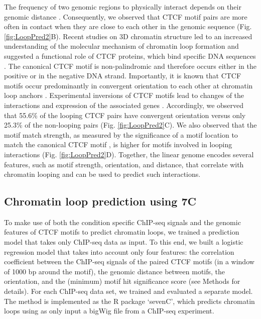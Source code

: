\documentclass[a4paper,twoside=true,openright,parskip=full,chapterprefix=true,11pt,headings=normal,bibliography=totoc,listof=totoc,titlepage=on,captions=tableabove,draft=false]{scrreprt}
\theoremstyle{definition}
\theoremstyle{definition}
\theoremstyle{definition}
\theoremstyle{remark}
\begin{document}
The frequency of two genomic regions to physically interact depends on
their genomic distance \citep{Lieberman-Aiden2009}. Consequently, we
observed that CTCF motif pairs are more often in contact when they are
close to each other in the genomic sequence (Fig. \ref{fig:LoopPred2}B).
Recent studies on 3D chromatin structure led to an increased
understanding of the molecular mechanism of chromatin loop formation and
suggested a functional role of CTCF proteins, which bind specific DNA
sequences \citep{Merkenschlager2016}. The canonical CTCF motif is
non-palindromic and therefore occurs either in the positive or in the
negative DNA strand. Importantly, it is known that CTCF motifs occur
predominantly in convergent orientation to each other at chromatin loop
anchors \citep{Rao2014, VietriRudan2015}. Experimental inversions of
CTCF motifs lead to changes of the interactions and expression of the
associated genes \citep{Guo2015, deWit2015}. Accordingly, we observed
that 55.6\% of the looping CTCF pairs have convergent orientation versus
only 25.3\% of the non-looping pairs (Fig. \ref{fig:LoopPred2}C). We
also observed that the motif match strength, as measured by the
significance of a motif location to match the canonical CTCF motif
\citep{Khan2018}, is higher for motifs involved in looping interactions
(Fig. \ref{fig:LoopPred2}D). Together, the linear genome encodes several
features, such as motif strength, orientation, and distance, that
correlate with chromatin looping and can be used to predict such
interactions.

\hypertarget{chromatin-loop-prediction-using-7c}{%
\subsection{Chromatin loop prediction using
7C}\label{chromatin-loop-prediction-using-7c}}

To make use of both the condition specific ChIP-seq signals and the
genomic features of CTCF motifs to predict chromatin loops, we trained a
prediction model that takes only ChIP-seq data as input. To this end, we
built a logistic regression model that takes into account only four
features: the correlation coefficient between the ChIP-seq signals of
the paired CTCF motifs (in a window of 1000 bp around the motif), the
genomic distance between motifs, the orientation, and the (minimum)
motif hit significance score (see Methods for details). For each
ChIP-seq data set, we trained and evaluated a separate model. The method
is implemented as the R package `sevenC', which predicts chromatin loops
using as only input a bigWig file from a ChIP-seq experiment.
\end{document}
